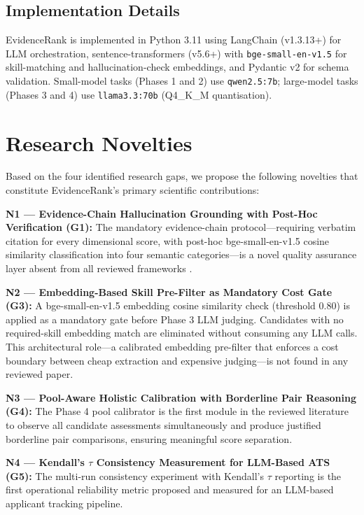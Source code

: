 \documentclass[journal]{IEEEtran}
\begin{document}
\subsection{Implementation Details}

EvidenceRank is implemented in Python 3.11 using LangChain (v1.3.13+) for LLM
orchestration, sentence-transformers (v5.6+) with \texttt{bge-small-en-v1.5} for skill-matching
and hallucination-check embeddings, and Pydantic v2 for schema validation. Small-model tasks (Phases 1 and 2) use \texttt{qwen2.5:7b}; large-model
tasks (Phases 3 and 4) use \texttt{llama3.3:70b} (Q4\_K\_M quantisation).



\section{Research Novelties}
\label{sec:novelty}

Based on the four identified research gaps, we propose the following novelties that
constitute EvidenceRank's primary scientific contributions:

\textbf{N1 — Evidence-Chain Hallucination Grounding with Post-Hoc Verification (G1):}
The mandatory evidence-chain protocol—requiring verbatim citation for every
dimensional score, with post-hoc bge-small-en-v1.5 cosine similarity classification into four
semantic categories—is a novel quality assurance layer absent from all reviewed
frameworks \cite{chowdhury2026,jahan2026,hoque2026,yuksel2026}.

\textbf{N2 — Embedding-Based Skill Pre-Filter as Mandatory Cost Gate (G3):}
A bge-small-en-v1.5 embedding cosine similarity check (threshold 0.80) is applied
as a mandatory gate before Phase 3 LLM judging. Candidates with no required-skill
embedding match are eliminated without consuming any LLM calls. This architectural
role—a calibrated embedding pre-filter that enforces a cost boundary between cheap
extraction and expensive judging—is not found in any reviewed paper.

\textbf{N3 — Pool-Aware Holistic Calibration with Borderline Pair Reasoning (G4):}
The Phase 4 pool calibrator is the first module in the reviewed literature to
observe all candidate assessments simultaneously and produce justified borderline
pair comparisons, ensuring meaningful score separation.

\textbf{N4 — Kendall's $\tau$ Consistency Measurement for LLM-Based ATS (G5):}
The multi-run consistency experiment with Kendall's $\tau$ reporting is the first
operational reliability metric proposed and measured for an LLM-based applicant
tracking pipeline.
\end{document}
